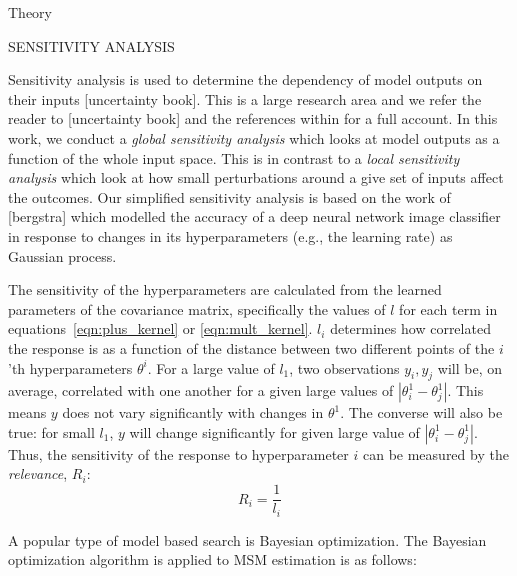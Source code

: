 Theory


SENSITIVITY ANALYSIS

Sensitivity analysis is used to determine the dependency of model outputs on their inputs [uncertainty book]. This is a large research area and we refer the reader to [uncertainty book] and the references within for a full account.  In this work, we conduct a \emph{global sensitivity analysis} which looks at model outputs as a function of the whole input space. This is in contrast to a \emph{local sensitivity analysis} which look at  how small perturbations around a give set of inputs affect the outcomes.  Our simplified sensitivity analysis is based on the work of [bergstra] which modelled the accuracy of a deep neural network image classifier in response to changes in its hyperparameters (e.g., the learning rate) as Gaussian process.  

The sensitivity of the hyperparameters are calculated from the learned parameters of the covariance matrix, specifically the values of $l$ for each term in equations~\ref{eqn:plus_kernel} or \ref{eqn:mult_kernel}.  $l_{i}$  determines how correlated the response is as a function of the distance between two different points of the $i$'th hyperparameters $\theta^{i}$. For a large value of $l_{1}$, two observations $y_{i}, y_{j}$ will be, on average, correlated with one another for a given large values of $|\theta_{i}^{1} - \theta_{j}^{1}|$. This means $y$ does not vary significantly with changes in $\theta^{1}$. The converse will also be true: for small $l_{1}$, $y$ will change significantly for given large value of $|\theta_{i}^{1} - \theta_{j}^{1}|$. Thus, the sensitivity of the response to hyperparameter $i$ can be measured by the \emph{relevance}, $R_{i}$: 
\begin{equation}\label{eqn:relevance_def}
    R_{i} = \frac{1}{l_{i}}
\end{equation}

A popular type of model based search is Bayesian optimization. The Bayesian optimization algorithm is applied to MSM estimation is as follows: 

